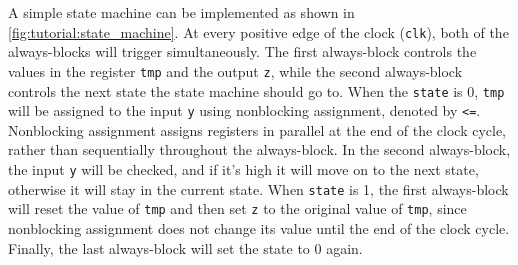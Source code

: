 A simple state machine can be implemented as shown in
\cref{fig:tutorial:state_machine}.  At every positive edge of the clock
(\texttt{clk}), both of the always-blocks will trigger simultaneously.  The
first always-block controls the values in the register \texttt{tmp} and the
output \texttt{z}, while the second always-block controls the next state the
state machine should go to.  When the \texttt{state} is 0, \texttt{tmp} will be
assigned to the input \texttt{y} using nonblocking assignment, denoted by
\texttt{<=}.  Nonblocking assignment assigns registers in parallel at the end of
the clock cycle, rather than sequentially throughout the always-block. In the
second always-block, the input \texttt{y} will be checked, and if it's high it
will move on to the next state, otherwise it will stay in the current state.
When \texttt{state} is 1, the first always-block will reset the value of
\texttt{tmp} and then set \texttt{z} to the original value of \texttt{tmp},
since nonblocking assignment does not change its value until the end of the
clock cycle.  Finally, the last always-block will set the state to 0 again.

